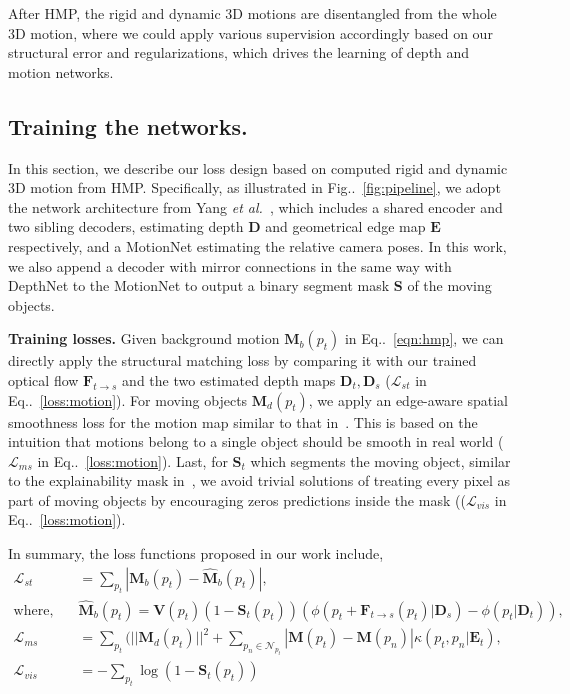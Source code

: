 \documentclass[runningheads]{llncs}
\makeatletter
\newcommand{\figref}[1]{Fig\onedot~\ref{#1}}
\newcommand{\equref}[1]{Eq\onedot~\eqref{#1}}
\newcommand{\ve}[1]{{\mathbf #1}} \newcommand{\hua}[1]{{\mathcal #1}}
\newcommand{\scr}[1]{{\mathcal #1}}
\DeclareRobustCommand\onedot{\futurelet\@let@token\@onedot}
\def\onedot{\ifx\@let@token.\else.\null\fi\xspace}
\def\etal{\emph{et al.}}
\makeatother
\begin{document}
After HMP, the rigid and dynamic 3D motions are disentangled from the whole 3D motion, where we could apply various supervision accordingly based on our structural error and regularizations, which drives the learning of depth and motion networks.

\subsection{Training the networks.}\label{subsec:training}
In this section, we describe our loss design based on computed rigid and dynamic 3D motion from HMP. 
Specifically, as illustrated in \figref{fig:pipeline}, we adopt the network architecture from Yang \etal~\cite{yang2018cvpr}, which includes a shared encoder and two sibling decoders, estimating depth $\ve{D}$ and geometrical edge map $\ve{E}$ respectively, and a MotionNet estimating the relative camera poses. In this work, we also append a decoder with mirror connections in the same way with DepthNet to the MotionNet to output a binary segment mask $\ve{S}$ of the moving objects.

\noindent\textbf{Training losses.} 
Given background motion $\ve{M}_b(p_t)$ in \equref{eqn:hmp}, we can directly apply the structural matching loss by comparing it with our trained optical flow $\ve{F}_{t\rightarrow s}$ and the two estimated depth maps $\ve{D}_t, \ve{D}_s$ ($\hua{L}_{st}$ in \equref{loss:motion}). 
For moving objects $\ve{M}_d(p_t)$, we apply an edge-aware spatial smoothness loss for the motion map similar to that in~\cite{yang2018cvpr}. This is based on the intuition that motions belong to a single object should be smooth in real world ($\hua{L}_{ms}$ in \equref{loss:motion}).
Last, for $\ve{S}_t$ which segments the moving object, similar to the explainability mask in~\cite{zhou2017unsupervised}, we avoid trivial solutions of treating every pixel as part of moving objects by encouraging zeros predictions inside the mask (($\hua{L}_{vis}$ in \equref{loss:motion}).

In summary, the loss functions proposed in our work include,
\begin{align}
\hua{L}_{st} &= \sum\nolimits_{p_t}|\ve{M}_b(p_t) - \hat{\ve{M}}_b(p_t)|, \nonumber \\
\mbox{where,~~~} &\hat{\ve{M}}_b(p_t) = \ve{V}(p_t)(1 - \ve{S}_t(p_t))(\phi(p_t+\ve{F}_{t\rightarrow s}(p_t)|\ve{D}_{s}) - \phi(p_t|\ve{D}_t)), \nonumber \\
\scr{L}_{ms} &= \sum\nolimits_{p_t}(||\ve{M}_d(p_t)||^2+\sum\nolimits_{p_n \in \hua{N}_{p_t}}|\ve{M}(p_t) - \ve{M}(p_n)|\kappa(p_t, p_n|\ve{E}_t), \nonumber \\
\scr{L}_{vis} &= -\sum\nolimits_{p_t}\log(1 - \ve{S}_t(p_t))
\label{loss:motion}
\end{align}
\end{document}
